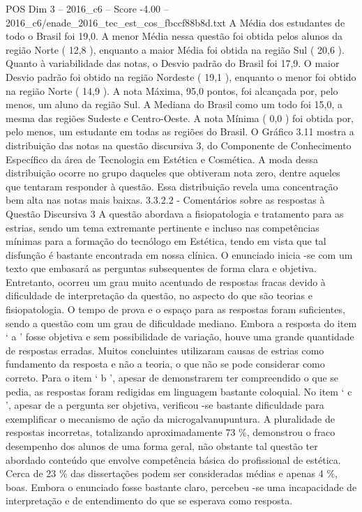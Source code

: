 \begin{textsample}{POS Dim 3 – 2016\_c6 – Score -4.00 – 2016\_c6/enade\_2016\_tec\_est\_cos\_fbccf88b8d.txt}
A Média dos estudantes de todo o Brasil foi 19,0.
A menor Média nessa questão foi obtida pelos alunos da região Norte ( 12,8 ), enquanto a maior Média foi obtida na região Sul ( 20,6 ).
Quanto à variabilidade das notas, o Desvio padrão do Brasil foi 17,9.
O maior Desvio padrão foi obtido na região Nordeste ( 19,1 ), enquanto o menor foi obtido na região Norte ( 14,9 ).
A nota Máxima, 95,0 pontos, foi alcançada por, pelo menos, um aluno da região Sul.
A Mediana do Brasil como um todo foi 15,0, a mesma das regiões Sudeste e Centro-Oeste.
A nota Mínima ( 0,0 ) foi obtida por, pelo menos, um estudante em todas as regiões do Brasil.
O Gráfico 3.11 mostra a distribuição das notas na questão discursiva 3, do Componente de Conhecimento Específico da área de Tecnologia em Estética e Cosmética.
A moda dessa distribuição ocorre no grupo daqueles que obtiveram nota zero, dentre aqueles que tentaram responder à questão.
Essa distribuição revela uma concentração bem alta nas notas mais baixas. 3.3.2.2 - Comentários sobre as respostas à Questão Discursiva 3 A questão abordava a fisiopatologia e tratamento para as estrias, sendo um tema extremante pertinente e incluso nas competências mínimas para a formação do tecnólogo em Estética, tendo em vista que tal disfunção é bastante encontrada em nossa clínica.
O enunciado inicia -se com um texto que embasará as perguntas subsequentes de forma clara e objetiva.
Entretanto, ocorreu um grau muito acentuado de respostas fracas devido à dificuldade de interpretação da questão, no aspecto do que são teorias e fisiopatologia.
O tempo de prova e o espaço para as respostas foram suficientes, sendo a questão com um grau de dificuldade mediano.
Embora a resposta do item ‘ a ’ fosse objetiva e sem possibilidade de variação, houve uma grande quantidade de respostas erradas.
Muitos concluintes utilizaram causas de estrias como fundamento da resposta e não a teoria, o que não se pode considerar como correto.
Para o item ‘ b ’, apesar de demonstrarem ter compreendido o que se pedia, as respostas foram redigidas em linguagem bastante coloquial.
No item ‘ c ’, apesar de a pergunta ser objetiva, verificou -se bastante dificuldade para exemplificar o mecanismo de ação da microgalvanupuntura.
A pluralidade de respostas incorretas, totalizando aproximadamente 73 \%, demonstrou o fraco desempenho dos alunos de uma forma geral, não obstante tal questão ter abordado conteúdo que envolve competência básica do profissional de estética.
Cerca de 23 \% das dissertações podem ser consideradas médias e apenas 4 \%, boas.
Embora o enunciado fosse bastante claro, percebeu -se uma incapacidade de interpretação e de entendimento do que se esperava como resposta.

\end{textsample}
